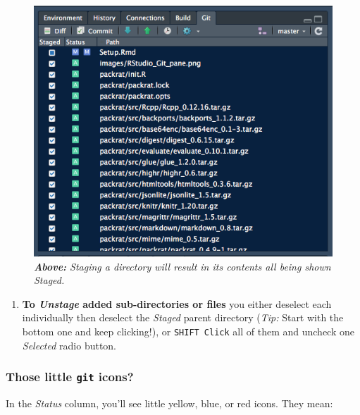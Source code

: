 \documentclass[]{book}
\providecommand{\tightlist}{%
  \setlength{\itemsep}{0pt}\setlength{\parskip}{0pt}}
\theoremstyle{definition}
\theoremstyle{definition}
\theoremstyle{definition}
\theoremstyle{remark}
\begin{document}
\begin{figure}
\centering
\includegraphics{images/RStudio_staged_directories.png}
\caption{\emph{\textbf{Above:} Staging a directory will result in its
contents all being shown Staged.}}
\end{figure}

\begin{enumerate}
\def\labelenumi{\arabic{enumi}.}
\setcounter{enumi}{2}
\tightlist
\item
  \textbf{To \emph{Unstage} added sub-directories or files} you either
  deselect each individually then deselect the \emph{Staged} parent
  directory (\emph{Tip:} Start with the bottom one and keep clicking!),
  or \texttt{SHIFT\ Click} all of them and uncheck one \emph{Selected}
  radio button.
\end{enumerate}

\hypertarget{those-little-git-icons}{%
\subsubsection{\texorpdfstring{Those little \texttt{git}
icons?}{Those little git icons?}}\label{those-little-git-icons}}

In the \emph{Status} column, you'll see little yellow, blue, or red
icons. They mean:
\end{document}
